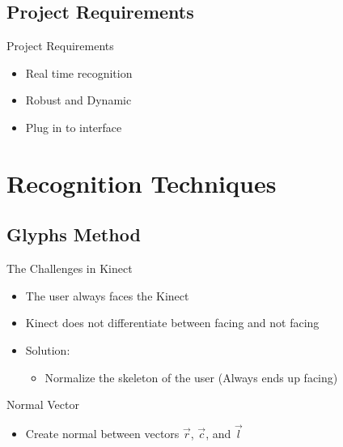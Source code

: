 \documentclass{beamer}
\begin{document}
\subsection{Project Requirements}

\begin{frame}{Project Requirements}
 \begin{itemize}
  \item Real time recognition
  \item Robust and Dynamic
  \item Plug in to interface
 \end{itemize}
\end{frame}

\section{Recognition Techniques}
\subsection{Glyphs Method}

\begin{frame}{The Challenges in Kinect}
 \begin{itemize}
  \item The user always faces the Kinect
  \item Kinect does not differentiate between facing and not facing
  \item Solution:
   \begin{itemize}
    \item Normalize the skeleton of the user (Always ends up facing)
   \end{itemize}
 \end{itemize}
\end{frame}

\begin{frame}{Normal Vector}
 \begin{itemize}
  \item Create normal between vectors $\vec{r}$, $\vec{c}$, and $\vec{l}$
 \end{itemize}
 \pause
 \end{frame}
\end{document}
